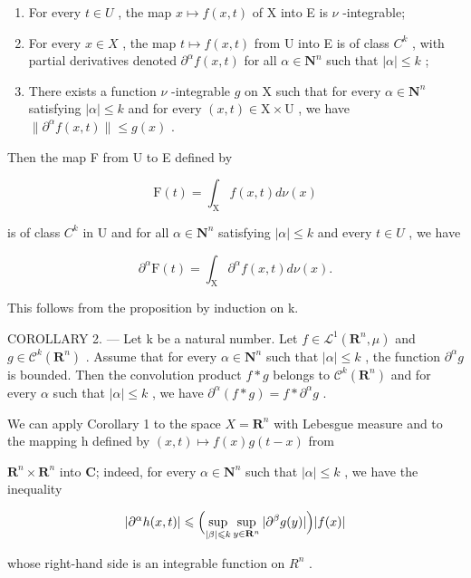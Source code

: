 \begin{enumerate}
\def\labelenumi{(\roman{enumi})}
\item
  For every \(t \in U\) , the map \(x \mapsto f(x, t)\) of X into E is \(\nu\) -integrable;
\item
  For every \(x \in X\) , the map \(t \mapsto f(x, t)\) from U into E is of class \(C^{k}\) , with partial derivatives denoted \(\partial^{\alpha}f(x, t)\) for all \(\alpha \in \mathbf{N}^{n}\) such that \(|\alpha| \leqslant k\) ;
\item
  There exists a function \(\nu\) -integrable \(g\) on X such that for every \(\alpha \in \mathbf{N}^n\) satisfying \(|\alpha| \leqslant k\) and for every \((x,t) \in \mathrm{X} \times \mathrm{U}\) , we have \(\|\partial^\alpha f(x,t)\| \leqslant g(x)\) .
\end{enumerate}

Then the map F from U to E defined by

\[
\mathrm{F} (t) = \int_ {\mathrm{X}} f (x, t) d \nu (x)
\]

is of class \(C^{k}\) in U and for all \(\alpha\in \mathbf{N}^{n}\) satisfying \(|\alpha|\leqslant k\) and every \(t\in U\) , we have

\[
\partial^ {\alpha} \mathrm{F} (t) = \int_ {\mathrm{X}} \partial^ {\alpha} f (x, t) d \nu (x).
\]

This follows from the proposition by induction on k.

COROLLARY 2. --- Let k be a natural number. Let \(f \in \mathcal{L}^1(\mathbf{R}^n, \mu)\) and \(g \in \mathcal{C}^k(\mathbf{R}^n)\) . Assume that for every \(\alpha \in \mathbf{N}^n\) such that \(|\alpha| \leqslant k\) , the function \(\partial^\alpha g\) is bounded. Then the convolution product \(f * g\) belongs to \(\mathcal{C}^k(\mathbf{R}^n)\) and for every \(\alpha\) such that \(|\alpha| \leqslant k\) , we have \(\partial^\alpha(f * g) = f * \partial^\alpha g\) .

We can apply Corollary 1 to the space \(X = \mathbf{R}^{n}\) with Lebesgue measure and to the mapping h defined by \((x, t) \mapsto f(x)g(t - x)\) from

\(\mathbf{R}^{n} \times \mathbf{R}^{n}\) into \(\mathbf{C}\); indeed, for every \(\alpha \in \mathbf{N}^{n}\) such that \(|\alpha| \leqslant k\) , we have the inequality

\[
| \partial^ {\alpha} h (x, t) | \leqslant \Bigl (\sup _ {| \beta | \leqslant k} \sup _ {y \in \mathbf {R} ^ {n}} | \partial^ {\beta} g (y) | \Bigr) | f (x) |
\]

whose right-hand side is an integrable function on \(R^{n}\) .


